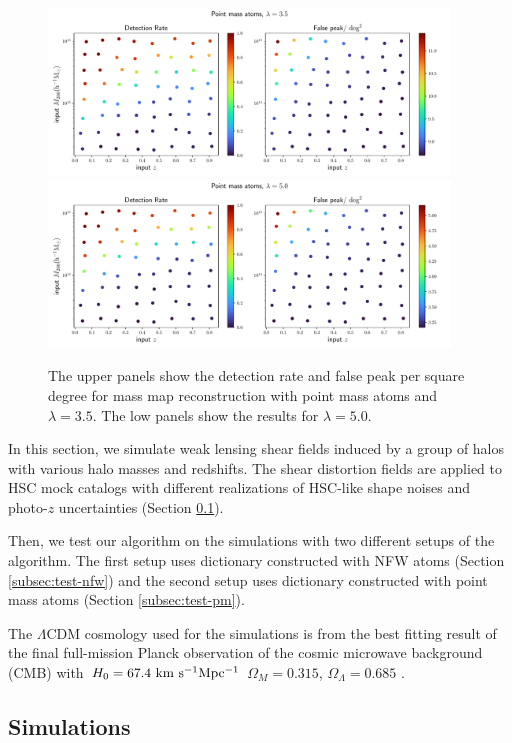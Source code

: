 \documentclass[twocolumn]{aastex62}
\begin{document}
\begin{figure}[!ht]
 \centering
 \includegraphics[width=0.95\textwidth]{detfalseRate_f1-1.pdf}
 \includegraphics[width=0.95\textwidth]{detfalseRate_f1-3.pdf}
 \caption{The upper panels show the detection rate and false peak per square degree for mass map reconstruction with
point mass atoms and $\lambda=3.5$. The low panels show the results for $\lambda=5.0$. }
\end{figure}

In this section, we simulate weak lensing shear fields induced by a group of halos with various halo masses 
and redshifts. The shear distortion fields are applied to HSC mock catalogs with different realizations of HSC-like shape 
noises and photo-$z$ uncertainties (Section \ref{subsec:Sims}).

Then, we test our algorithm on the simulations with two different setups of the algorithm. The first setup uses dictionary
constructed with NFW atoms (Section \ref{subsec:test-nfw}) and the second setup uses dictionary constructed with point mass 
atoms (Section \ref{subsec:test-pm}).

The $\Lambda$CDM cosmology used for the simulations is from the best fitting result of the final full-mission Planck observation 
of the cosmic microwave background (CMB) with $H_0=67.4 ~\rm{km~s^{-1} Mpc^{-1}}$ $\Omega_M=0.315$, $\Omega_\Lambda=0.685$
\citep{cmb-Planck2018-Cosmology}.

\subsection{Simulations}
\label{subsec:Sims}
\end{document}
